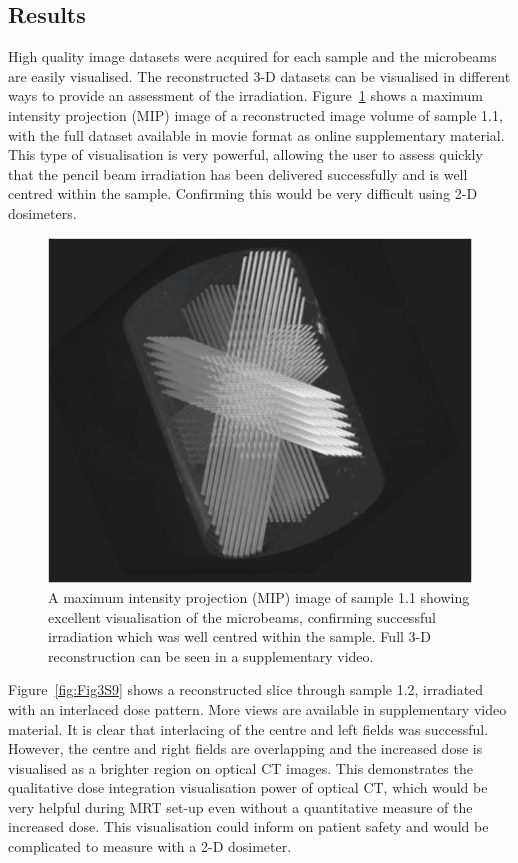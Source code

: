 	
	
	
	\subsection{Results}
	High quality image datasets were acquired for each sample and the microbeams are easily visualised. The reconstructed 3-D datasets can be visualised in different ways to provide an assessment of the irradiation. Figure~\ref{fig:Fig2MIP} shows a maximum intensity projection (MIP) image of a reconstructed image volume of sample 1.1, with the full dataset available in movie format as online supplementary material. This type of visualisation is very powerful, allowing the user to assess quickly that the pencil beam irradiation has been delivered successfully and is well centred within the sample. Confirming this would be very difficult using 2-D dosimeters. 
	
	\begin{figure}
		\centering
		\includegraphics[width=0.7\linewidth]{mrt_img/mrt_Fig2}
		\caption{A maximum intensity projection (MIP) image of sample 1.1 showing excellent visualisation of the microbeams, confirming successful irradiation which was well centred within the sample. Full 3-D reconstruction can be seen in a supplementary video.}
		\label{fig:Fig2MIP}
	\end{figure}
	
	
	Figure~\ref{fig:Fig3S9} shows a reconstructed slice through sample 1.2, irradiated with an interlaced dose pattern. More views are available in supplementary video material. It is clear that interlacing of the centre and left fields was successful. However, the centre and right fields are overlapping and the increased dose is visualised as a brighter region on optical CT images. This demonstrates the qualitative dose integration visualisation power of optical CT, which would be very helpful during MRT set-up even without a quantitative measure of the increased dose. This visualisation could inform on patient safety and would be complicated to measure with a 2-D dosimeter. 
	
